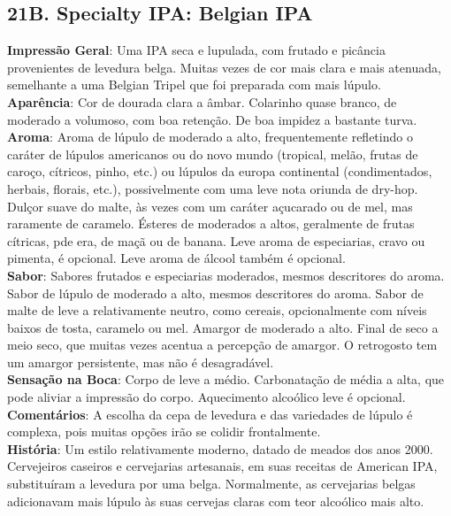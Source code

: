 \subsection*{21B. Specialty IPA: Belgian IPA}
\textbf{Impressão Geral}: Uma IPA seca e lupulada, com frutado e picância provenientes de levedura belga. Muitas vezes de cor mais clara e mais atenuada, semelhante a uma Belgian Tripel que foi preparada com mais lúpulo. \\
\textbf{Aparência}: Cor de dourada clara a âmbar. Colarinho quase branco, de moderado a volumoso, com boa retenção. De boa impidez a bastante turva. \\
\textbf{Aroma}: Aroma de lúpulo de moderado a alto, frequentemente refletindo o caráter de lúpulos americanos ou do novo mundo (tropical, melão, frutas de caroço, cítricos, pinho, etc.) ou lúpulos da europa continental (condimentados, herbais, florais, etc.), possivelmente com uma leve nota oriunda de dry-hop. Dulçor suave do malte, às vezes com um caráter açucarado ou de mel, mas raramente de caramelo. Ésteres de moderados a altos, geralmente de frutas cítricas, pde era, de maçã ou de banana. Leve aroma de especiarias, cravo ou pimenta, é opcional. Leve aroma de álcool também é opcional. \\
\textbf{Sabor}: Sabores frutados e especiarias moderados, mesmos descritores do aroma. Sabor de lúpulo de moderado a alto, mesmos descritores do aroma. Sabor de malte de leve a relativamente neutro, como cereais, opcionalmente com níveis baixos de tosta, caramelo ou mel. Amargor de moderado a alto. Final de seco a meio seco, que muitas vezes acentua a percepção de amargor. O retrogosto tem um amargor persistente, mas não é desagradável. \\
\textbf{Sensação na Boca}: Corpo de leve a médio. Carbonatação de média a alta, que pode aliviar a impressão do corpo. Aquecimento alcoólico leve é opcional. \\
\textbf{Comentários}: A escolha da cepa de levedura e das variedades de lúpulo é complexa, pois muitas opções irão se colidir frontalmente. \\
\textbf{História}: Um estilo relativamente moderno, datado de meados dos anos 2000. Cervejeiros caseiros e cervejarias artesanais, em suas receitas de American IPA, substituíram a levedura por uma belga. Normalmente, as cervejarias belgas adicionavam mais lúpulo às suas cervejas claras com teor alcoólico mais alto. \\
